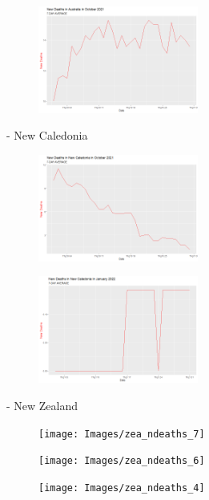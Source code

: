 \documentclass[a4paper]{article}
\theoremstyle{definition}
\begin{document}
\begin{enumerate}[i)]
\begin{enumerate}[1)]
		\begin{figure} [!htp]
  		\centering
  		\includegraphics [width=0.47\textwidth] {Images/aus_ndeaths_2}
		\end{figure}
	- New Caledonia\\
		\begin{figure} [!htp]
  		\centering
  		\includegraphics [width=0.47\textwidth] {Images/cal_ndeaths_1}
		\end{figure}
		
		\begin{figure} [!htp]
  		\centering
  		\includegraphics [width=0.47\textwidth] {Images/cal_ndeaths_2}
		\end{figure}
	- New Zealand\\
		\begin{figure} [!htp]
  		\centering
  		\texttt{[image: Images/zea\_ndeaths\_7]}
		\end{figure}
		
		\begin{figure} [!htp]
  		\centering
  		\texttt{[image: Images/zea\_ndeaths\_6]}
		\end{figure}
		
		\begin{figure} [!htp]
  		\centering
  		\texttt{[image: Images/zea\_ndeaths\_4]}
		\end{figure}
		

\end{enumerate}
\end{enumerate}
\end{document}
